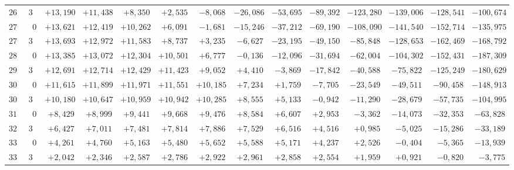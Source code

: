 \begin{landscape}
\begin{longtable}{@{}rr|r|r|r|r|r|r|r|r|r|r|r|r@{}}
\(262\) & \(30\) & \(+13{,}190\) & \(+11{,}438\) & \(+8{,}350\) & \(+2{,}535\) & \(-8{,}068\) & \(-26{,}086\) & \(-53{,}695\) & \(-89{,}392\) & \(-123{,}280\) & \(-139{,}006\) & \(-128{,}541\) & \(-100{,}674\)\\[2pt]
\(270\) & \(0\) & \(+13{,}621\) & \(+12{,}419\) & \(+10{,}262\) & \(+6{,}091\) & \(-1{,}681\) & \(-15{,}246\) & \(-37{,}212\) & \(-69{,}190\) & \(-108{,}090\) & \(-141{,}540\) & \(-152{,}714\) & \(-135{,}975\)\\
\(277\) & \(30\) & \(+13{,}693\) & \(+12{,}972\) & \(+11{,}583\) & \(+8{,}737\) & \(+3{,}235\) & \(-6{,}627\) & \(-23{,}195\) & \(-49{,}150\) & \(-85{,}848\) & \(-128{,}653\) & \(-162{,}469\) & \(-168{,}792\)\\
\(285\) & \(0\) & \(+13{,}385\) & \(+13{,}072\) & \(+12{,}304\) & \(+10{,}501\) & \(+6{,}777\) & \(-0{,}136\) & \(-12{,}096\) & \(-31{,}694\) & \(-62{,}004\) & \(-104{,}302\) & \(-152{,}431\) & \(-187{,}309\)\\
\(292\) & \(30\) & \(+12{,}691\) & \(+12{,}714\) & \(+12{,}429\) & \(+11{,}423\) & \(+9{,}052\) & \(+4{,}410\) & \(-3{,}869\) & \(-17{,}842\) & \(-40{,}588\) & \(-75{,}822\) & \(-125{,}249\) & \(-180{,}629\)\\[2pt]
\(300\) & \(0\) & \(+11{,}615\) & \(+11{,}899\) & \(+11{,}971\) & \(+11{,}551\) & \(+10{,}185\) & \(+7{,}234\) & \(+1{,}759\) & \(-7{,}705\) & \(-23{,}549\) & \(-49{,}511\) & \(-90{,}458\) & \(-148{,}913\)\\
\(307\) & \(30\) & \(+10{,}180\) & \(+10{,}647\) & \(+10{,}959\) & \(+10{,}942\) & \(+10{,}285\) & \(+8{,}555\) & \(+5{,}133\) & \(-0{,}942\) & \(-11{,}290\) & \(-28{,}679\) & \(-57{,}735\) & \(-104{,}995\)\\
\(315\) & \(0\) & \(+8{,}429\) & \(+8{,}999\) & \(+9{,}441\) & \(+9{,}668\) & \(+9{,}476\) & \(+8{,}584\) & \(+6{,}607\) & \(+2{,}953\) & \(-3{,}362\) & \(-14{,}073\) & \(-32{,}353\) & \(-63{,}828\)\\
\(322\) & \(30\) & \(+6{,}427\) & \(+7{,}011\) & \(+7{,}481\) & \(+7{,}814\) & \(+7{,}886\) & \(+7{,}529\) & \(+6{,}516\) & \(+4{,}516\) & \(+0{,}985\) & \(-5{,}025\) & \(-15{,}286\) & \(-33{,}189\)\\[2pt]
\(330\) & \(0\) & \(+4{,}261\) & \(+4{,}760\) & \(+5{,}163\) & \(+5{,}480\) & \(+5{,}652\) & \(+5{,}588\) & \(+5{,}171\) & \(+4{,}237\) & \(+2{,}526\) & \(-0{,}404\) & \(-5{,}365\) & \(-13{,}939\)\\
\(337\) & \(30\) & \(+2{,}042\) & \(+2{,}346\) & \(+2{,}587\) & \(+2{,}786\) & \(+2{,}922\) & \(+2{,}961\) & \(+2{,}858\) & \(+2{,}554\) & \(+1{,}959\) & \(+0{,}921\) & \(-0{,}820\) & \(-3{,}775\)\\

\end{longtable}
\end{landscape}
